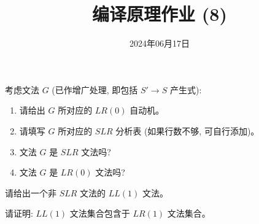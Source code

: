 \documentclass[a4paper, justified]{tufte-handout}
\title{编译原理作业 (8)}
\date{2024年06月17日}
\begin{document}
\maketitle
\noplagiarism %
\begin{abstract}
\end{abstract}
\beginrequired

\begin{problem}[$LR$ 语法分析]
  考虑文法 $G$ (已作增广处理, 即包括 $S' \to S$ 产生式):

	

  \begin{enumerate}[(1)]
    \item 请给出 $G$ 所对应的 $LR(0)$ 自动机。
		\item 请填写 $G$ 所对应的 $SLR$ 分析表 (如果行数不够, 可自行添加)。
		\item 文法 $G$ 是 $SLR$ 文法吗?
		\item 文法 $G$ 是 $LR(0)$ 文法吗?
  \end{enumerate}

	\newpage
	
\end{problem}

\begin{problem}
	请给出一个非 $SLR$ 文法的 $LL(1)$ 文法。
\end{problem}

\begin{solution}
\end{solution}

\begin{problem}
	请证明: $LL(1)$ 文法集合包含于 $LR(1)$ 文法集合。
\end{problem}

\begin{solution}
\end{solution}




\end{document}
